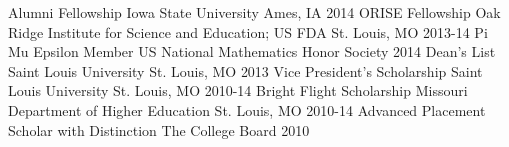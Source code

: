 \documentclass[11pt, a4paper]{awesome-cv}
\begin{document}
\begin{cvhonors}
  \cvhonor
    {Alumni Fellowship}
    {Iowa State University}
    {Ames, IA}
    {2014}
  \cvhonor
    {ORISE Fellowship}
    {Oak Ridge Institute for Science and Education; US FDA}
    {St. Louis, MO}
    {2013-14}
    \cvhonor
    {Pi Mu Epsilon Member}
    {US National Mathematics Honor Society}
    {}
    {2014}
  \cvhonor
    {Dean's List}
    {Saint Louis University}
    {St. Louis, MO}
    {2013}
   \cvhonor
    {Vice President's Scholarship}
    {Saint Louis University}
    {St. Louis, MO}
    {2010-14}
  \cvhonor
    {Bright Flight Scholarship}
    {Missouri Department of Higher Education}
    {St. Louis, MO}
    {2010-14}
  \cvhonor
    {Advanced Placement Scholar with Distinction}
    {The College Board}
    {}
    {2010}
\end{cvhonors}
\end{document}
